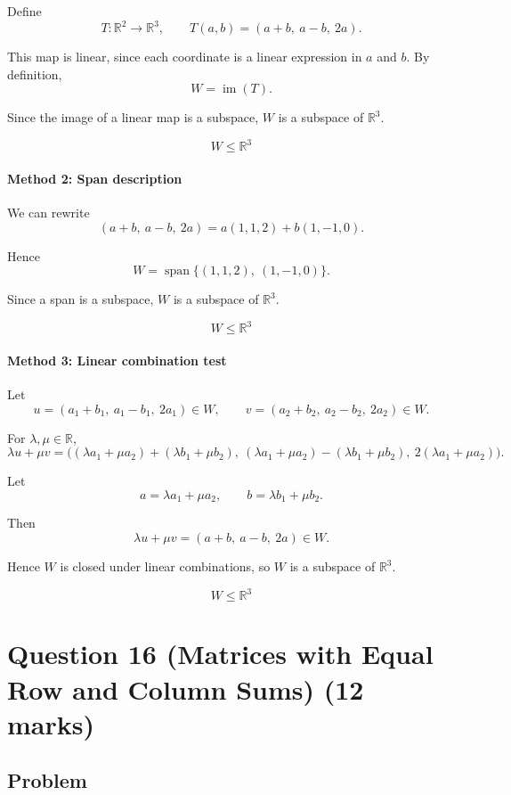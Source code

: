 \documentclass[12pt]{article}
\newcommand{\Span}{\operatorname{span}}
\begin{document}
Define
\[
T:\mathbb R^2\to\mathbb R^3,\qquad
T(a,b)=(a+b,\ a-b,\ 2a).
\]

This map is linear, since each coordinate is a linear expression in \(a\) and \(b\). By definition,
\[
W=\operatorname{im}(T).
\]

Since the image of a linear map is a subspace, \(W\) is a subspace of \(\mathbb R^3\).

\[
\boxed{W\le \mathbb R^3}
\]

\paragraph{Method 2: Span description}

We can rewrite
\[
(a+b,\ a-b,\ 2a)
=
a(1,1,2)+b(1,-1,0).
\]

Hence
\[
W=\Span\{(1,1,2),\ (1,-1,0)\}.
\]

Since a span is a subspace, \(W\) is a subspace of \(\mathbb R^3\).

\[
\boxed{W\le \mathbb R^3}
\]

\paragraph{Method 3: Linear combination test}

Let
\[
u=(a_1+b_1,\ a_1-b_1,\ 2a_1)\in W,
\qquad
v=(a_2+b_2,\ a_2-b_2,\ 2a_2)\in W.
\]

For \(\lambda,\mu\in\mathbb R\),
\[
\lambda u+\mu v
=
\bigl(
(\lambda a_1+\mu a_2)+(\lambda b_1+\mu b_2),\ 
(\lambda a_1+\mu a_2)-(\lambda b_1+\mu b_2),\ 
2(\lambda a_1+\mu a_2)
\bigr).
\]

Let
\[
a=\lambda a_1+\mu a_2,\qquad b=\lambda b_1+\mu b_2.
\]

Then
\[
\lambda u+\mu v=(a+b,\ a-b,\ 2a)\in W.
\]

Hence \(W\) is closed under linear combinations, so \(W\) is a subspace of \(\mathbb R^3\).

\[
\boxed{W\le \mathbb R^3}
\]


\newpage
\section{Question 16 (Matrices with Equal Row and Column Sums) \hfill (12 marks)}
\subsection{Problem}
\end{document}
